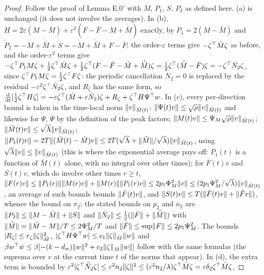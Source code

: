 \begin{proof}
Follow the proof of Lemma E.0$'$ with $\bar M$, $P_1$, $S$, $P_2$ as defined here. (a) is unchanged (it does not
involve the averages). In (b), $\dot H=2\varepsilon(M-\bar M)+\varepsilon^2(F-\bar F-\dot M+\dot{\bar M})$ exactly,
by $\dot P_1=2(M-\bar M)$ and $\dot P_2=-\dot M+\dot{\bar M}+\dot S=-\dot M+\dot{\bar M}+F-\bar F$; the
order-$\varepsilon$ terms give $-\zeta^\top\bar M\zeta$ as before, and the order-$\varepsilon^2$ terms give
$-\zeta^\top P_1M\zeta+\frac12\zeta^\top\dot M\zeta+\frac12\zeta^\top(F-\bar F-\dot M+\dot{\bar M})\zeta
=\frac12\zeta^\top(\dot{\bar M}-\bar F)\zeta=-\zeta^\top\bar N_2\zeta$, since $\zeta^\top P_1M\zeta=\frac12\zeta^\top F\zeta$:
the periodic cancellation $N_2=0$ is replaced by the residual $-\varepsilon^2\zeta^\top\bar N_2\zeta$, and $R_\zeta$ has
the same form, so
$\frac{\mathrm{d}}{\mathrm{d}t}[\frac12\zeta^\top H\zeta]=-\varepsilon\zeta^\top(\bar M+\varepsilon\bar N_2)\zeta+R_\zeta+\zeta^\top H\Psi^\top w$.
In (c), every per-direction bound is taken in the time-local norm $\lVert v\rVert_{\bar M(t)}$:
$\lVert \Psi(t)v\rVert\le\sqrt\rho\lVert v\rVert_{\bar M(t)}$ and likewise for $\dot\Psi$, $\ddot\Psi$ by the definition of the
peak factors; $\lVert M(t)v\rVert\le\Psi_M\sqrt\rho\lVert v\rVert_{\bar M(t)}$;
$\lVert \bar M(t)v\rVert\le\sqrt\Lambda\lVert v\rVert_{\bar M(t)}$;
$\lVert P_1(t)v\rVert=2T\lVert (\bar M(t)-\hat M)v\rVert\le2T(\sqrt\Lambda+\lVert \hat M\rVert/\sqrt\lambda)\lVert v\rVert_{\bar M(t)}$, using
$\sqrt\lambda\lVert v\rVert\le\lVert v\rVert_{\bar M(t)}$ (this is where the exponential average pays off: $P_1(t)$ is a function
of $\bar M(t)$ alone, with no integral over other times); for $\bar F(t)v$ and $S(t)v$, which do involve other times
$r\ge t$,
$\lVert F(r)v\rVert\le\lVert P_1(r)\rVert\lVert M(r)v\rVert+\lVert M(r)\rVert\lVert P_1(r)v\rVert\le2p_1\Psi_M^2\lVert v\rVert\le(2p_1\Psi_M^2/\sqrt\lambda)\lVert v\rVert_{\bar M(t)}$,
an average of such bounds bounds $\lVert \bar F(t)v\rVert$, and $\lVert S(t)v\rVert\le T(\lVert \bar F(t)v\rVert+\lVert \hat Fv\rVert)$,
whence the bound on $\pi_2$; the stated bounds on $p_2$ and $n_2$ are $\lVert P_2\rVert\le\lVert M-\bar M\rVert+\lVert S\rVert$ and
$\lVert \bar N_2\rVert\le\frac12(\lVert \bar F\rVert+\lVert \dot{\bar M}\rVert)$ with $\lVert \dot{\bar M}\rVert=\lVert \bar M-M\rVert/T\le2\Psi_M^2/T$
and $\lVert \bar F\rVert\le\sup\lVert F\rVert\le2p_1\Psi_M^2$. The bounds $\lvert R_\zeta\rvert\le r_\zeta\lVert \zeta\rVert^2_{\bar M}$,
$\lvert \zeta^\top H\Psi^\top w\rvert\le c_1\lVert \zeta\rVert_{\bar M}\lVert w\rVert$ and
$\beta w^\top\dot w\le\beta[-(k-d_w)\lVert w\rVert^2+c_2\lVert \zeta\rVert_{\bar M}\lVert w\rVert]$ follow with the same formulas (the
suprema over $v$ at the current time $t$ of the norms that appear). In (d), the extra term is bounded by
$\varepsilon^2\lvert \zeta^\top\bar N_2\zeta\rvert\le\varepsilon^2n_2\lVert \zeta\rVert^2\le(\varepsilon^2n_2/\lambda)\zeta^\top\bar M\zeta=\varepsilon\delta_2\zeta^\top\bar M\zeta$,

\end{proof}
